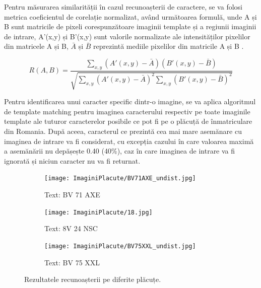 \documentclass[12pt]{article}
\begin{document}
Pentru m\u{a}surarea similarit\u{a}ții \^{i}n cazul recunoașterii de caractere, se va folosi metrica coeficientul de corelație normalizat, av\^{a}nd urm\u{a}toarea formul\u{a}, unde A și B sunt matricile de pixeli corespunz\u{a}toare imaginii template și a regiunii imaginii de intrare, A'(x,y) și B'(x,y) sunt valorile normalizate ale intensit\u{a}ților pixelilor din matricele A și B, \ensuremath{\bar{A}} și \ensuremath{\bar{B}} reprezint\u{a} mediile pixelilor din matricile A și B \cite{templatematching}.

\begin{equation}
R(A, B) = \frac{\sum_{x,y} (A'(x,y) - \bar{A})(B'(x,y) - \bar{B})}{\sqrt{\sum_{x,y} (A'(x,y) - \bar{A})^2 \sum_{x,y} (B'(x,y) - \bar{B})^2}}
\end{equation}

Pentru identificarea unui caracter specific dintr-o imagine, se va aplica algoritmul de template matching pentru imaginea caracterului respectiv pe toate imaginile template ale tuturor caracterelor posibile ce pot fi pe o pl\u{a}cuț\u{a} de \^{i}nmatriculare din Romania. Dup\u{a} aceea, caracterul ce prezint\u{a} cea mai mare asem\u{a}nare cu imaginea de intrare va fi considerat, cu excepția cazului \^{i}n care valoarea maxim\u{a} a asem\u{a}n\u{a}rii nu dep\u{a}șește 0.40 (40\%), caz \^{i}n care imaginea de intrare va fi ignorat\u{a} și niciun caracter nu va fi returnat.

\begin{figure}[htbp]
    \centering
    \begin{subfigure}{0.3\textwidth}
        \texttt{[image: ImaginiPlacute/BV71AXE\_undist.jpg]}
        \caption{Text: BV 71 AXE}
        \label{fig:img1}
    \end{subfigure}
    \hfill
    \begin{subfigure}{0.3\textwidth}
        \texttt{[image: ImaginiPlacute/18.jpg]}
        \caption{Text: 8V 24 NSC}
        \label{fig:img2}
    \end{subfigure}
    \hfill
    \begin{subfigure}{0.3\textwidth}
        \texttt{[image: ImaginiPlacute/BV75XXL\_undist.jpg]}
        \caption{Text: BV 75 XXL}
        \label{fig:img3}
    \end{subfigure}
    \caption{Rezultatele recunoașterii pe diferite pl\u{a}cuțe.}
    \label{fig:rezultate_recunoastere_text}
\end{figure}
\end{document}
